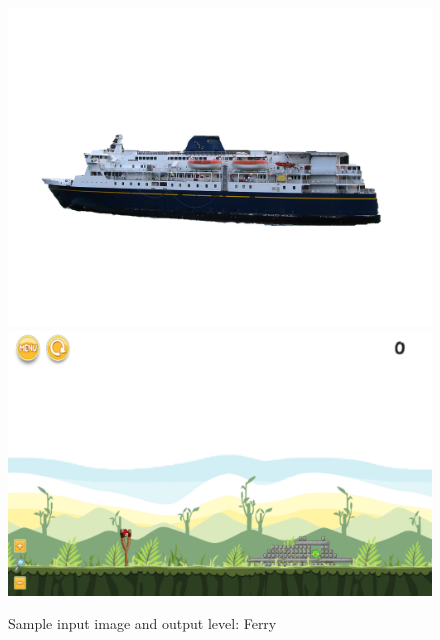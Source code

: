 \documentclass{dalthesis}
\begin{document}
\begin{figure}
	\caption{Sample input image and output level: Ferry}
  \includegraphics[width=\textwidth,height=\textheight,keepaspectratio]{levels/pictures/ships/ferry.jpg}
  \includegraphics[width=\textwidth,height=\textheight,keepaspectratio]{levels/screenshots/ships/ferry.png}
\end{figure}
\end{document}
